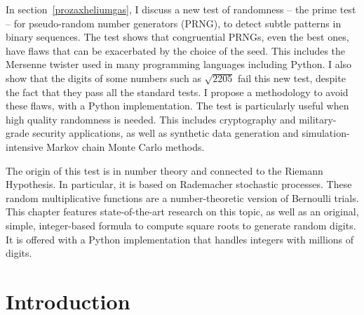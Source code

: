 \documentclass[oneside,10pt]{book}
\begin{document}
In section~\ref{prozaxheliumgas}, I discuss a new test of randomness -- the prime test -- for pseudo-random number generators (PRNG), to detect subtle patterns in binary sequences. The test shows that congruential PRNGs, even the best ones, have flaws that can be exacerbated by the choice of the seed. This includes the Mersenne twister used in many programming languages including Python. I also show that the digits of some numbers such as $\sqrt{2205}$ fail this new test, despite the fact that they pass all the standard tests. I propose a methodology to avoid these flaws, with a Python implementation. The test is particularly useful when high quality randomness is needed. This includes cryptography and military-grade security applications, as well as
\textcolor{index}{synthetic data} generation and simulation-intensive \textcolor{index}{Markov chain Monte Carlo} methods.  

The origin of this test is in number theory and connected to the Riemann 
Hypothesis. In particular, it is based on Rademacher stochastic processes. These random multiplicative functions are a number-theoretic version of Bernoulli trials.  This chapter features state-of-the-art research on this topic, as well as an original, simple, integer-based formula to compute square roots to generate random digits. It is offered with a Python implementation that handles integers with millions of digits. 

\hypersetup{linkcolor=red} 

\section{Introduction}\label{pivizintro}
\end{document}
